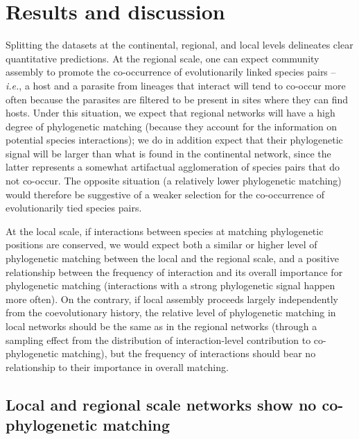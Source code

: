 \documentclass[11pt,serif]{article}
\begin{document}
\section{Results and discussion}\label{results-and-discussion}

Splitting the datasets at the continental, regional, and local levels
delineates clear quantitative predictions. At the regional scale, one
can expect community assembly to promote the co-occurrence of
evolutionarily linked species pairs -- \emph{i.e.}, a host and a
parasite from lineages that interact will tend to co-occur more often
because the parasites are filtered to be present in sites where they can
find hosts. Under this situation, we expect that regional networks will
have a high degree of phylogenetic matching (because they account for
the information on potential species interactions); we do in addition
expect that their phylogenetic signal will be larger than what is found
in the continental network, since the latter represents a somewhat
artifactual agglomeration of species pairs that do not co-occur. The
opposite situation (a relatively lower phylogenetic matching) would
therefore be suggestive of a weaker selection for the co-occurrence of
evolutionarily tied species pairs.

At the local scale, if interactions between species at matching
phylogenetic positions are conserved, we would expect both a similar or
higher level of phylogenetic matching between the local and the regional
scale, and a positive relationship between the frequency of interaction
and its overall importance for phylogenetic matching (interactions with
a strong phylogenetic signal happen more often). On the contrary, if
local assembly proceeds largely independently from the coevolutionary
history, the relative level of phylogenetic matching in local networks
should be the same as in the regional networks (through a sampling
effect from the distribution of interaction-level contribution to
co-phylogenetic matching), but the frequency of interactions should bear
no relationship to their importance in overall matching.

\subsection{Local and regional scale networks show no co-phylogenetic
matching}\label{local-and-regional-scale-networks-show-no-co-phylogenetic-matching}
\end{document}
